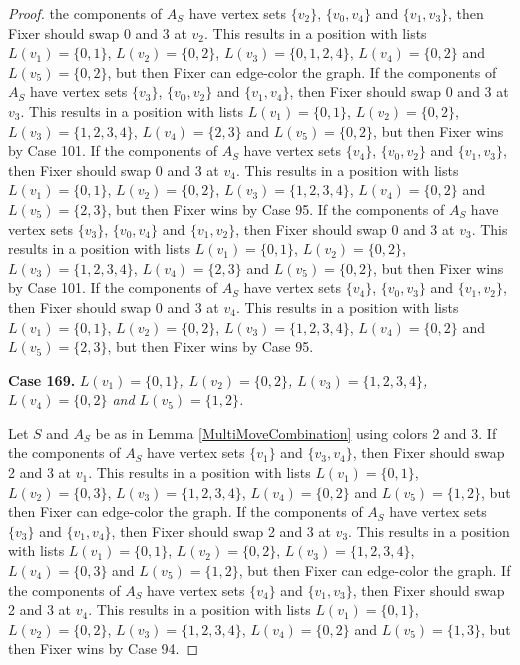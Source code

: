 \documentclass[12pt]{amsart}
\theoremstyle{plain}
\theoremstyle{definition}
\theoremstyle{remark}
\begin{document}
\begin{proof}
the components of $A_S$ have vertex sets $\{v_2\}$, $\{v_0, v_4\}$ and $\{v_1, v_3\}$, then Fixer should swap 0 and 3 at $v_2$. This results in a position with lists $L(v_1) = \{0, 1\}$, $L(v_2) = \{0, 2\}$, $L(v_3) = \{0, 1, 2, 4\}$, $L(v_4) = \{0, 2\}$ and $L(v_5) = \{0, 2\}$, but then Fixer can edge-color the graph. If the components of $A_S$ have vertex sets $\{v_3\}$, $\{v_0, v_2\}$ and $\{v_1, v_4\}$, then Fixer should swap 0 and 3 at $v_3$. This results in a position with lists $L(v_1) = \{0, 1\}$, $L(v_2) = \{0, 2\}$, $L(v_3) = \{1, 2, 3, 4\}$, $L(v_4) = \{2, 3\}$ and $L(v_5) = \{0, 2\}$, but then Fixer wins by Case 101. If the components of $A_S$ have vertex sets $\{v_4\}$, $\{v_0, v_2\}$ and $\{v_1, v_3\}$, then Fixer should swap 0 and 3 at $v_4$. This results in a position with lists $L(v_1) = \{0, 1\}$, $L(v_2) = \{0, 2\}$, $L(v_3) = \{1, 2, 3, 4\}$, $L(v_4) = \{0, 2\}$ and $L(v_5) = \{2, 3\}$, but then Fixer wins by Case 95. If the components of $A_S$ have vertex sets $\{v_3\}$, $\{v_0, v_4\}$ and $\{v_1, v_2\}$, then Fixer should swap 0 and 3 at $v_3$. This results in a position with lists $L(v_1) = \{0, 1\}$, $L(v_2) = \{0, 2\}$, $L(v_3) = \{1, 2, 3, 4\}$, $L(v_4) = \{2, 3\}$ and $L(v_5) = \{0, 2\}$, but then Fixer wins by Case 101. If the components of $A_S$ have vertex sets $\{v_4\}$, $\{v_0, v_3\}$ and $\{v_1, v_2\}$, then Fixer should swap 0 and 3 at $v_4$. This results in a position with lists $L(v_1) = \{0, 1\}$, $L(v_2) = \{0, 2\}$, $L(v_3) = \{1, 2, 3, 4\}$, $L(v_4) = \{0, 2\}$ and $L(v_5) = \{2, 3\}$, but then Fixer wins by Case 95. 

\noindent\textbf{Case 169.  }\textit{$L(v_1) = \{0, 1\}$, $L(v_2) = \{0, 2\}$, $L(v_3) = \{1, 2, 3, 4\}$, $L(v_4) = \{0, 2\}$ and $L(v_5) = \{1, 2\}$.}

Let $S$ and $A_S$ be as in Lemma \ref{MultiMoveCombination} using colors $2$ and $3$. If the components of $A_S$ have vertex sets $\{v_1\}$ and $\{v_3, v_4\}$, then Fixer should swap 2 and 3 at $v_1$. This results in a position with lists $L(v_1) = \{0, 1\}$, $L(v_2) = \{0, 3\}$, $L(v_3) = \{1, 2, 3, 4\}$, $L(v_4) = \{0, 2\}$ and $L(v_5) = \{1, 2\}$, but then Fixer can edge-color the graph. If the components of $A_S$ have vertex sets $\{v_3\}$ and $\{v_1, v_4\}$, then Fixer should swap 2 and 3 at $v_3$. This results in a position with lists $L(v_1) = \{0, 1\}$, $L(v_2) = \{0, 2\}$, $L(v_3) = \{1, 2, 3, 4\}$, $L(v_4) = \{0, 3\}$ and $L(v_5) = \{1, 2\}$, but then Fixer can edge-color the graph. If the components of $A_S$ have vertex sets $\{v_4\}$ and $\{v_1, v_3\}$, then Fixer should swap 2 and 3 at $v_4$. This results in a position with lists $L(v_1) = \{0, 1\}$, $L(v_2) = \{0, 2\}$, $L(v_3) = \{1, 2, 3, 4\}$, $L(v_4) = \{0, 2\}$ and $L(v_5) = \{1, 3\}$, but then Fixer wins by Case 94. 


\end{proof}
\end{document}
